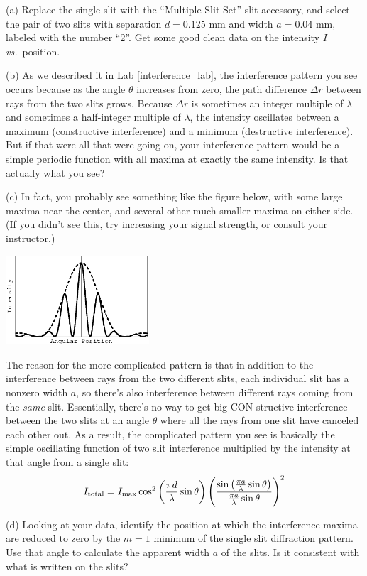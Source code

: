 (a) Replace the single slit with the ``Multiple Slit Set'' slit accessory, and select the pair of two slits with separation $d=0.125$ mm and width $a=0.04$ mm, labeled with the number ``2''.  Get some good clean data on the intensity $I$ \textit{vs.}~position.

(b) As we described it in Lab \ref{interference_lab}, the interference pattern you see occurs because as the angle $\theta$ increases from zero, the path difference $\Delta r$ between rays from the two slits grows.  Because $\Delta r$ is sometimes an integer multiple of $\lambda$ and sometimes a half-integer multiple of $\lambda$, the intensity oscillates between a maximum (constructive interference) and a minimum (destructive interference).  But if that were all that were going on, your interference pattern would be a simple periodic function with all maxima at exactly the same intensity.  Is that actually what you see?
\answerspace{0.4in}

(c) In fact, you probably see something like the figure below, with some large maxima near the center, and several other much smaller maxima on either side.  (If you didn't see this, try increasing your signal strength, or consult your instructor.)

\vspace{-0.1in}
\begin{center}
\includegraphics[width=0.4\textwidth]{diffraction_of_light/diffraction_of_light_fig_4.eps}
\end{center}
\vspace{-0.1in}

The reason for the more complicated pattern is that in addition to the interference between rays from the two different slits, each individual slit has a nonzero width $a$, so there's also interference between different rays coming from the \textit{same} slit.  Essentially, there's no way to get big CON-structive interference between the two slits at an angle $\theta$ where all the rays from one slit have canceled each other out.  As a result, the complicated pattern you see is basically the simple oscillating function of two slit interference multiplied by the intensity at that angle from a single slit: 
\begin{displaymath} 
I_{\rm{total}} = I_{\rm{max}} \cos^2 \left (\frac {\pi d} {\lambda} \sin \theta \right) \left(\frac {\sin \left (\frac {\pi a} {\lambda} \sin \theta \right )} {\frac {\pi a} {\lambda} \sin \theta} \right)^2 \end{displaymath}

(d) Looking at your data, identify the position at which the interference maxima  are reduced to zero by the $m=1$ minimum of the single slit diffraction pattern.  Use that angle to calculate the apparent width $a$ of the slits.  Is it consistent with what is written on the slits?
\answerspace{1in}
